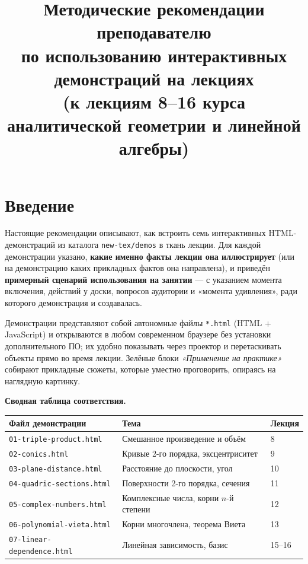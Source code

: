 \documentclass[12pt,a4paper]{article}
\title{Методические рекомендации преподавателю\\
по использованию интерактивных демонстраций на лекциях\\
\large (к лекциям 8--16 курса аналитической геометрии и линейной алгебры)}
\author{}
\date{}
\begin{document}
\maketitle
\thispagestyle{fancy}

\section*{Введение}

Настоящие рекомендации описывают, как встроить семь интерактивных
HTML-демонстраций из каталога \texttt{new-tex/demos} в ткань лекции.
Для каждой демонстрации указано, \textbf{какие именно факты лекции она
иллюстрирует} (или на демонстрацию каких прикладных фактов она направлена),
и приведён \textbf{примерный сценарий использования на занятии} — с указанием
момента включения, действий у доски, вопросов аудитории и «момента удивления»,
ради которого демонстрация и создавалась.

Демонстрации представляют собой автономные файлы \texttt{*.html} (HTML + JavaScript)
и открываются в любом современном браузере без установки дополнительного ПО;
их удобно показывать через проектор и перетаскивать объекты прямо во время
лекции. Зелёные блоки \emph{«Применение на практике»} собирают прикладные
сюжеты, которые уместно проговорить, опираясь на наглядную картинку.

\medskip
\noindent\textbf{Сводная таблица соответствия.}
\begin{center}
\renewcommand{\arraystretch}{1.3}
\begin{tabular}{@{}p{}p{}p{}@{}}
\hline
\textbf{Файл демонстрации} & \textbf{Тема} & \textbf{Лекция}\\
\hline
\texttt{01-triple-product.html}   & Смешанное произведение и объём          & 8\\
\texttt{02-conics.html}           & Кривые 2-го порядка, эксцентриситет     & 9\\
\texttt{03-plane-distance.html}   & Расстояние до плоскости, угол           & 10\\
\texttt{04-quadric-sections.html} & Поверхности 2-го порядка, сечения       & 11\\
\texttt{05-complex-numbers.html}  & Комплексные числа, корни $n$-й степени  & 12\\
\texttt{06-polynomial-vieta.html} & Корни многочлена, теорема Виета         & 13\\
\texttt{07-linear-dependence.html}& Линейная зависимость, базис             & 15--16\\
\hline
\end{tabular}
\end{center}

\bigskip


\bigskip

\bigskip

\bigskip

\bigskip

\bigskip

\bigskip

\end{document}
